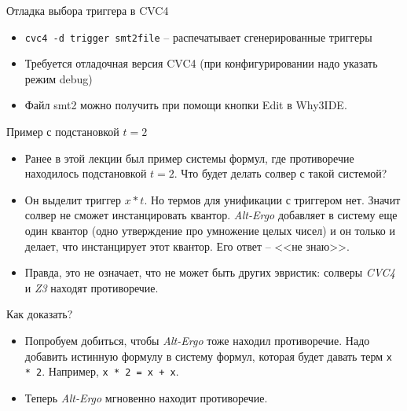 \documentclass[hyperref={unicode=true}]{beamer}
\begin{document}
    \begin{frame}{Отладка выбора триггера в CVC4}
    \begin{itemize}
    \item
    \texttt{cvc4 -d trigger smt2file} -- распечатывает
    сгенерированные триггеры
    \item
    Требуется отладочная версия CVC4 (при конфигурировании
    надо указать режим debug)
    \item
    Файл smt2 можно получить при помощи кнопки Edit
    в Why3IDE.
    \end{itemize}
    \end{frame}

    \begin{frame}{Пример с подстановкой $t = 2$}
    \begin{itemize}
    \item
    Ранее в этой лекции был пример системы формул, где противоречие
    находилось подстановкой $t = 2$. Что будет делать солвер с такой системой?
    \item
    Он выделит триггер $x * t$. Но термов для унификации с триггером нет.
    Значит солвер не сможет инстанцировать квантор. \textsl{Alt-Ergo}
    добавляет в систему еще один квантор (одно утверждение про умножение
    целых чисел) и он только и делает, что инстанцирует этот квантор. Его
    ответ -- <<не знаю>>.
    \item
    Правда, это не означает, что не может быть других эвристик: солверы
    \textsl{CVC4} и \textsl{Z3} находят противоречие.
    \end{itemize}
    \end{frame}

    \begin{frame}{Как доказать?}
    \begin{itemize}
    \item
    Попробуем добиться, чтобы \textsl{Alt-Ergo} тоже находил противоречие.
    Надо добавить истинную формулу в систему формул, которая будет давать
    терм \texttt{x * 2}. Например, \texttt{x * 2 = x + x}.
    \item
    Теперь \textsl{Alt-Ergo} мгновенно находит противоречие.
    \end{itemize}
    \end{frame}
\end{document}
